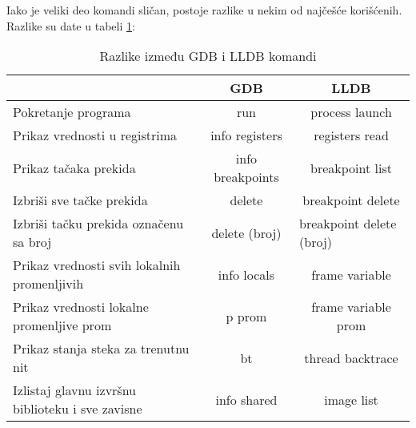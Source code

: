 \documentclass[a4paper]{article}
\begin{document}
Iako je veliki deo komandi sličan, postoje razlike u nekim od 
najčešće korišćenih\cite{lldb}. Razlike su date u tabeli \ref{tab:tabela1}:


\begin{table}[h!]
\begin{center}
\caption{Razlike između GDB i LLDB komandi}
\begin{tabular}{|l|c|c|} \hline
                                                 & GDB            & LLDB                                                                  \\ \hline
\rowcolor[HTML]{C0C0C0} 
Pokretanje programa                              & run            & process launch                                                        \\
Prikaz vrednosti u registrima                    & info registers & registers read                                                        \\
\rowcolor[HTML]{C0C0C0} 
Prikaz tačaka prekida                            & info breakpoints     & breakpoint list                                                       \\
Izbriši sve tačke prekida                        & delete         & breakpoint delete                                                     \\
\rowcolor[HTML]{C0C0C0} 
Izbriši tačku prekida označenu sa broj           & delete (broj)  & \multicolumn{1}{l|}{\cellcolor[HTML]{C0C0C0}breakpoint delete (broj)} \\
Prikaz vrednosti svih lokalnih promenljivih      & info locals    & frame variable                                                        \\
\rowcolor[HTML]{C0C0C0} 
Prikaz vrednosti lokalne promenljive prom        & p prom         & frame variable prom                                                   \\
Prikaz stanja steka za trenutnu nit              & bt             & thread backtrace                                                      \\
\rowcolor[HTML]{C0C0C0} 
Izlistaj glavnu izvršnu biblioteku i sve zavisne & info shared    & image list                                                            \\ \hline
\end{tabular}
\label{tab:tabela1}
\end{center}
\end{table}
\end{document}
